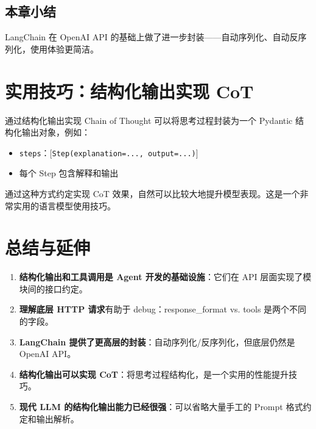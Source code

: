 \documentclass[a4paper]{article}
\begin{document}
\subsection{本章小结}

LangChain 在 OpenAI API 的基础上做了进一步封装——自动序列化、自动反序列化，使用体验更简洁。

\section{实用技巧：结构化输出实现 CoT}

\begin{importantbox}{通过结构化输出实现 Chain of Thought}
可以将思考过程封装为一个 Pydantic 结构化输出对象，例如：
\begin{itemize}
    \item \texttt{steps}：{[}\texttt{Step(explanation=..., output=...)}{]}
    \item 每个 Step 包含解释和输出
\end{itemize}
通过这种方式约定实现 CoT 效果，自然可以比较大地提升模型表现。这是一个非常实用的语言模型使用技巧。
\end{importantbox}

\section{总结与延伸}

\begin{enumerate}
    \item \textbf{结构化输出和工具调用是 Agent 开发的基础设施}：它们在 API 层面实现了模块间的接口约定。
    \item \textbf{理解底层 HTTP 请求}有助于 debug：response\_format vs. tools 是两个不同的字段。
    \item \textbf{LangChain 提供了更高层的封装}：自动序列化/反序列化，但底层仍然是 OpenAI API。
    \item \textbf{结构化输出可以实现 CoT}：将思考过程结构化，是一个实用的性能提升技巧。
    \item \textbf{现代 LLM 的结构化输出能力已经很强}：可以省略大量手工的 Prompt 格式约定和输出解析。
\end{enumerate}
\end{document}
